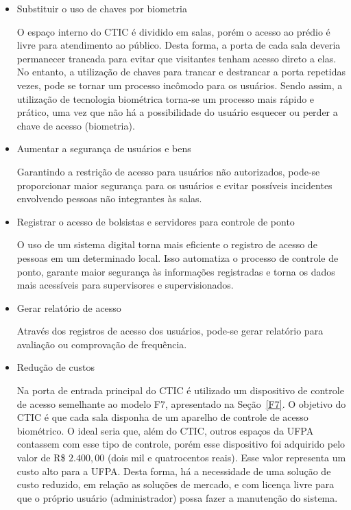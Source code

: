 \begin{itemize}

\item Substituir o uso de chaves por biometria

O espaço interno do CTIC é dividido em salas, porém o acesso ao prédio é livre para atendimento ao público. Desta forma, a porta de cada sala deveria permanecer trancada para evitar que visitantes tenham acesso direto a elas. No entanto, a utilização de chaves para trancar e destrancar a porta repetidas vezes, pode se tornar um processo incômodo para os usuários. Sendo assim, a utilização de tecnologia biométrica torna-se um processo mais rápido e prático, uma vez que não há a possibilidade do usuário esquecer ou perder a chave de acesso (biometria). 


\item Aumentar a segurança de usuários e bens

Garantindo a restrição de acesso para usuários não autorizados, pode-se proporcionar maior segurança para os usuários e evitar possíveis incidentes envolvendo pessoas não integrantes às salas.


\item Registrar o acesso de bolsistas e servidores para controle de ponto

O uso de um sistema digital torna mais eficiente o registro de acesso de pessoas em um determinado local. Isso automatiza o processo de controle de ponto, garante maior segurança às informações registradas e torna os dados mais acessíveis para supervisores e supervisionados.  


\item Gerar relatório de acesso

Através dos registros de acesso dos usuários, pode-se gerar relatório para avaliação ou comprovação de frequência.


\item Redução de custos

Na porta de entrada principal do CTIC é utilizado um dispositivo de controle de acesso semelhante ao modelo F7, apresentado na Seção~\ref{F7}. O objetivo do CTIC é que cada sala disponha de um aparelho de controle de acesso biométrico. O ideal seria que, além do CTIC, outros espaços da UFPA contassem com esse tipo de controle, porém esse dispositivo foi adquirido pelo valor de R\$ $2.400,00$ (dois mil e quatrocentos reais). Esse valor representa um custo alto para a UFPA. Desta forma, há a necessidade de uma solução de custo reduzido, em relação as soluções de mercado, e com licença livre para que o próprio usuário (administrador) possa fazer a manutenção do sistema.

\end{itemize}

